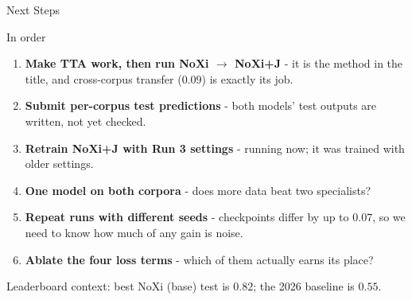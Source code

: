 \documentclass[aspectratio=169]{beamer}
\begin{document}
	\begin{frame}{Next Steps}
		\begin{block}{In order}
			\small
			\begin{enumerate}
				\item \textbf{Make TTA work, then run NoXi $\to$ NoXi+J} - it is the method in the
				title, and cross-corpus transfer ($0.09$) is exactly its job.
				\item \textbf{Submit per-corpus test predictions} - both models' test outputs are
				written, not yet checked.
				\item \textbf{Retrain NoXi+J with Run 3 settings} - running now; it was trained with
				older settings.
				\item \textbf{One model on both corpora} - does more data beat two specialists?
				\item \textbf{Repeat runs with different seeds} - checkpoints differ by up to $0.07$,
				so we need to know how much of any gain is noise.
				\item \textbf{Ablate the four loss terms} - which of them actually earns its place?
			\end{enumerate}
		\end{block}
		\vspace{0.4em}
		\centering\small
		Leaderboard context: best NoXi (base) test is $0.82$; the 2026 baseline is $0.55$.
	\end{frame}
\end{document}

